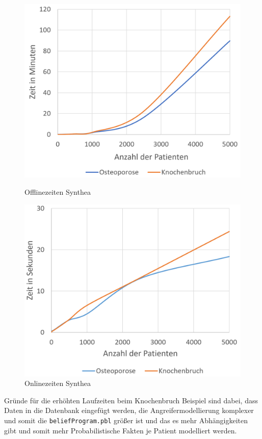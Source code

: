 \documentclass[german,version-2020-11]{uzl-thesis}
\begin{document}
	\begin{figure}[ht]
		\begin{minipage}{.5\textwidth}
		\centering
		\includegraphics[width=0.9\linewidth]{assets/OfflinezeitSynthea.png}
		\caption{Offlinezeiten Synthea}
		\label{fig:syntheaoffline}
	\end{minipage}
	\begin{minipage}{.5\textwidth}
		\centering
		\includegraphics[width=0.9\linewidth]{assets/onlineSynthea.png}
		\caption{Onlinezeiten Synthea}
		\label{fig:syntheaonline}
	\end{minipage}
\end{figure}
\noindent
Gründe für die erhöhten Laufzeiten beim Knochenbruch Beispiel sind dabei, dass Daten in die Datenbank eingefügt werden, die Angreifermodellierung komplexer und somit die \texttt{beliefProgram.pbl} größer ist und das es mehr Abhängigkeiten gibt und somit mehr Probabilistische Fakten je Patient modelliert werden.  
\end{document}
